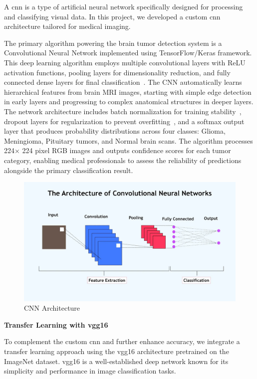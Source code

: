 A \gls{cnn} is a type of artificial neural network specifically designed for
processing and classifying visual data. In this project, we developed a custom
\gls{cnn} architecture tailored for medical imaging.

The primary algorithm powering the brain tumor detection system is a
Convolutional Neural Network implemented using TensorFlow/Keras framework. This
deep learning algorithm employs multiple convolutional layers with ReLU
activation functions, pooling layers for dimensionality reduction, and fully
connected dense layers for final classification~\cite{krizhevsky2012imagenet}.
The CNN automatically learns hierarchical features from brain MRI images,
starting with simple edge detection in early layers and progressing to complex
anatomical structures in deeper layers. The network architecture includes batch
normalization for training stability~\cite{ioffe2015batch}, dropout layers for
regularization to prevent overfitting~\cite{srivastava2014dropout}, and a
softmax output layer that produces probability distributions across four
classes: Glioma, Meningioma, Pituitary tumors, and Normal brain scans. The
algorithm processes 224$ \times$ 224 pixel RGB images and outputs confidence
scores for each tumor category, enabling medical professionals to assess the
reliability of predictions alongside the primary classification result.

\begin{figure}[H]
    \centering
    \includegraphics[width=0.85\linewidth]{Images/cnn.png}
    \caption{CNN Architecture}
    \label{fig:CNN Architecture}
\end{figure}

\textbf{Transfer Learning with \gls{vgg16}}

To complement the custom \gls{cnn} and further enhance accuracy, we integrate a
transfer learning approach using the \gls{vgg16} architecture pretrained on the
ImageNet dataset. \gls{vgg16} is a well-established deep network known for its
simplicity and performance in image classification tasks.

